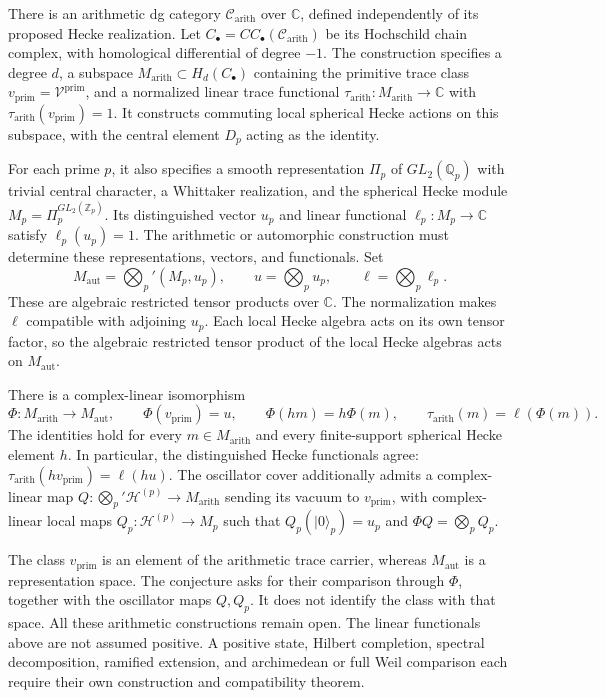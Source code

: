 \begin{conjecture}
\label{v4-arith:thm:beilinson-honest-reading}
There is an arithmetic dg category $\mathscr C_{\mathrm{arith}}$ over
$\mathbb C$, defined independently of its proposed Hecke realization.
Let $C_\bullet=CC_\bullet(\mathscr C_{\mathrm{arith}})$ be its Hochschild
chain complex, with homological differential of degree $-1$.
The construction specifies a degree $d$, a subspace
$M_{\mathrm{arith}}\subset H_d(C_\bullet)$ containing the primitive
trace class $v_{\mathrm{prim}}=\mathcal V^{\mathrm{prim}}$, and a
normalized linear trace functional
$\tau_{\mathrm{arith}}:M_{\mathrm{arith}}\to\mathbb C$ with
$\tau_{\mathrm{arith}}(v_{\mathrm{prim}})=1$.
It constructs commuting local spherical Hecke actions on this subspace,
with the central element $D_p$ acting as the identity.

For each prime $p$, it also specifies a smooth representation
$\Pi_p$ of $GL_2(\mathbb Q_p)$ with trivial central character,
a Whittaker realization, and the spherical Hecke module
$M_p=\Pi_p^{GL_2(\mathbb Z_p)}$. Its distinguished vector $u_p$
and linear functional $\ell_p:M_p\to\mathbb C$ satisfy
$\ell_p(u_p)=1$. The arithmetic or automorphic construction must
determine these representations, vectors, and functionals.
Set
\[
 M_{\mathrm{aut}}=\bigotimes_p'(M_p,u_p),\qquad
 u=\bigotimes_pu_p,\qquad
 \ell=\bigotimes_p\ell_p.
\]
These are algebraic restricted tensor products over $\mathbb C$.
The normalization makes $\ell$ compatible with adjoining $u_p$.
Each local Hecke algebra acts on its own tensor factor, so the
algebraic restricted tensor product of the local Hecke algebras acts
on $M_{\mathrm{aut}}$.

There is a complex-linear isomorphism
\[
 \Phi:M_{\mathrm{arith}}\longrightarrow M_{\mathrm{aut}},\qquad
 \Phi(v_{\mathrm{prim}})=u,\qquad
 \Phi(hm)=h\Phi(m),\qquad
 \tau_{\mathrm{arith}}(m)=\ell(\Phi(m)).
\]
The identities hold for every $m\in M_{\mathrm{arith}}$ and every
finite-support spherical Hecke element $h$.
In particular, the distinguished Hecke functionals agree:
$\tau_{\mathrm{arith}}(h v_{\mathrm{prim}})=\ell(hu)$.
The oscillator cover additionally admits a complex-linear map
$Q:\bigotimes_p'\mathcal H^{(p)}\to M_{\mathrm{arith}}$ sending its
vacuum to $v_{\mathrm{prim}}$, with complex-linear local maps
$Q_p:\mathcal H^{(p)}\to M_p$ such that
$Q_p(|0\rangle_p)=u_p$ and $\Phi Q=\bigotimes_pQ_p$.
\end{conjecture}

The class $v_{\mathrm{prim}}$ is an element of the arithmetic trace
carrier, whereas $M_{\mathrm{aut}}$ is a representation space.
The conjecture asks for their comparison through $\Phi$, together
with the oscillator maps $Q,Q_p$. It does not identify the class
with that space. All these arithmetic constructions remain open.
The linear functionals above are not assumed positive. A positive
state, Hilbert completion, spectral decomposition, ramified extension,
and archimedean or full Weil comparison each require their own
construction and compatibility theorem.


